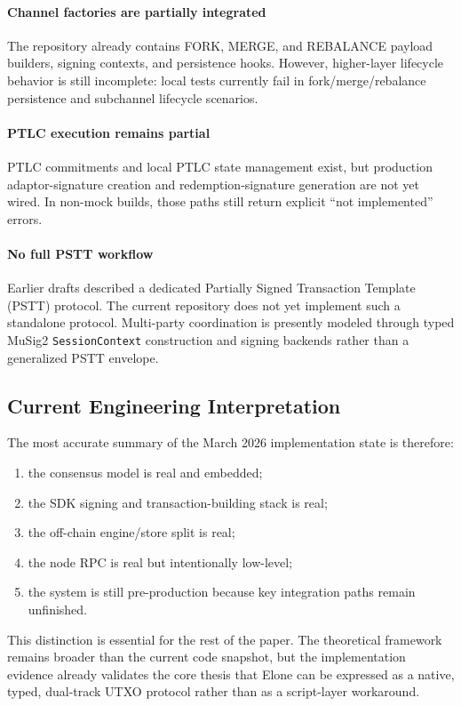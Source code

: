 \paragraph{Channel factories are partially integrated}
The repository already contains FORK, MERGE, and REBALANCE payload builders, signing contexts, and persistence hooks. However, higher-layer lifecycle behavior is still incomplete: local tests currently fail in fork/merge/rebalance persistence and subchannel lifecycle scenarios.

\paragraph{PTLC execution remains partial}
PTLC commitments and local PTLC state management exist, but production adaptor-signature creation and redemption-signature generation are not yet wired. In non-mock builds, those paths still return explicit ``not implemented'' errors.

\paragraph{No full PSTT workflow}
Earlier drafts described a dedicated Partially Signed Transaction Template (PSTT) protocol. The current repository does not yet implement such a standalone protocol. Multi-party coordination is presently modeled through typed MuSig2 \texttt{SessionContext} construction and signing backends rather than a generalized PSTT envelope.

\subsection{Current Engineering Interpretation}

The most accurate summary of the March 2026 implementation state is therefore:
\begin{enumerate}
    \item the consensus model is real and embedded;
    \item the SDK signing and transaction-building stack is real;
    \item the off-chain engine/store split is real;
    \item the node RPC is real but intentionally low-level;
    \item the system is still pre-production because key integration paths remain unfinished.
\end{enumerate}

This distinction is essential for the rest of the paper. The theoretical framework remains broader than the current code snapshot, but the implementation evidence already validates the core thesis that Elone can be expressed as a native, typed, dual-track UTXO protocol rather than as a script-layer workaround.
